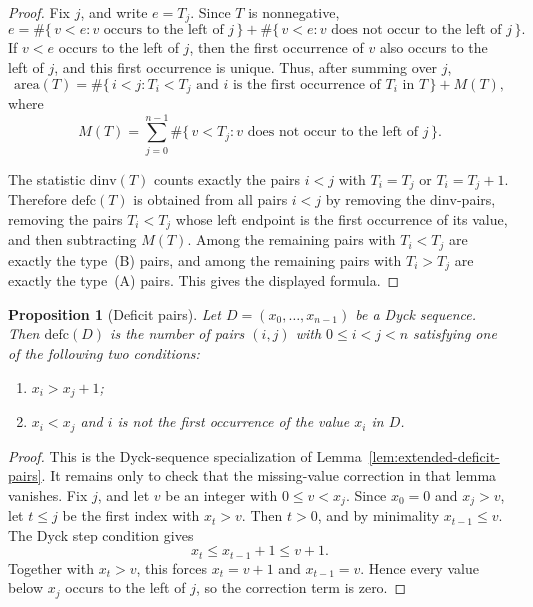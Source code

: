 \documentclass[11pt]{article}
\theoremstyle{plain}
\newtheorem{proposition}[theorem]{Proposition}
\theoremstyle{definition}
\theoremstyle{remark}
\newcommand{\dinv}{\mathrm{dinv}}
\newcommand{\area}{\mathrm{area}}
\newcommand{\defc}{\mathrm{defc}}
\begin{document}
\begin{proof}
Fix \(j\), and write \(e=T_j\).  Since \(T\) is nonnegative,
\[
  e
  =
  \#\{\,v<e:v\text{ occurs to the left of }j\,\}
  +
  \#\{\,v<e:v\text{ does not occur to the left of }j\,\}.
\]
If \(v<e\) occurs to the left of \(j\), then the first occurrence of \(v\)
also occurs to the left of \(j\), and this first occurrence is unique.  Thus,
after summing over \(j\),
\[
  \area(T)
  =
  \#\{\,i<j:T_i<T_j\text{ and }i\text{ is the first occurrence of }T_i
  \text{ in }T\,\}
  + M(T),
\]
where
\[
  M(T)=
  \sum_{j=0}^{n-1}
  \#\{\,v<T_j:v\text{ does not occur to the left of }j\,\}.
\]

The statistic \(\dinv(T)\) counts exactly the pairs \(i<j\) with
\(T_i=T_j\) or \(T_i=T_j+1\).  Therefore
\(\defc(T)\) is obtained from all pairs \(i<j\) by removing
the \(\dinv\)-pairs, removing the pairs \(T_i<T_j\) whose left endpoint is the
first occurrence of its value, and then subtracting \(M(T)\).  Among the
remaining pairs with \(T_i<T_j\) are exactly the type~\textup{(B)} pairs, and
among the remaining pairs with \(T_i>T_j\) are exactly the
type~\textup{(A)} pairs.  This gives the displayed formula.
\end{proof}

\begin{proposition}[Deficit pairs]
\label{prop:deficit-pair-count}
Let \(D=(x_0,\ldots,x_{n-1})\) be a Dyck sequence. Then \(\defc(D)\) is the
number of pairs \((i,j)\) with \(0\le i<j<n\) satisfying one of the following
two conditions:
\begin{enumerate}[label=\textup{(\Alph*)}]
  \item \(x_i>x_j+1\);
  \item \(x_i<x_j\) and \(i\) is not the first occurrence of the value \(x_i\)
  in \(D\).
\end{enumerate}
\end{proposition}

\begin{proof}
This is the Dyck-sequence specialization of
Lemma~\ref{lem:extended-deficit-pairs}.  It remains only to check that the
missing-value correction in that lemma vanishes.  Fix \(j\), and let \(v\) be
an integer with \(0\le v<x_j\). Since \(x_0=0\) and \(x_j>v\), let \(t\le j\)
be the first index with \(x_t>v\). Then \(t>0\), and by minimality
\(x_{t-1}\le v\). The Dyck step condition gives
\[
  x_t\le x_{t-1}+1\le v+1.
\]
Together with \(x_t>v\), this forces \(x_t=v+1\) and \(x_{t-1}=v\). Hence
every value below \(x_j\) occurs to the left of \(j\), so the correction term
is zero.
\end{proof}
\end{document}
